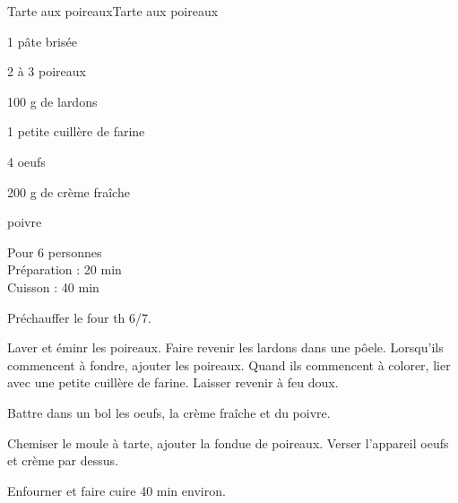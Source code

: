 \begin{recette}{Tarte aux poireaux}{Tarte aux poireaux}

\begin{ingredients}
1 pâte brisée\par
2 à 3 poireaux\par
100 g de lardons\par
1 petite cuillère de farine\par
4 oeufs\par
200 g de crème fraîche\par
poivre\par
\end{ingredients}

\begin{infos}
Pour 6 personnes\\
Préparation : 20 min\\
Cuisson : 40 min\\
\end{infos}

\begin{etapes}
\item Préchauffer le four th 6/7.
\item Laver et éminr les poireaux. Faire revenir les lardons dans une pôele. Lorsqu'ils commencent à fondre, ajouter les poireaux. Quand ils commencent à colorer, lier avec une petite cuillère de farine. Laisser revenir à feu doux.
\item Battre dans un bol les oeufs, la crème fraîche et du poivre.
\item Chemiser le moule à tarte, ajouter la fondue de poireaux. Verser l'appareil oeufs et crème par dessus.
\item Enfourner et faire cuire 40 min environ.
\end{etapes}

\end{recette}